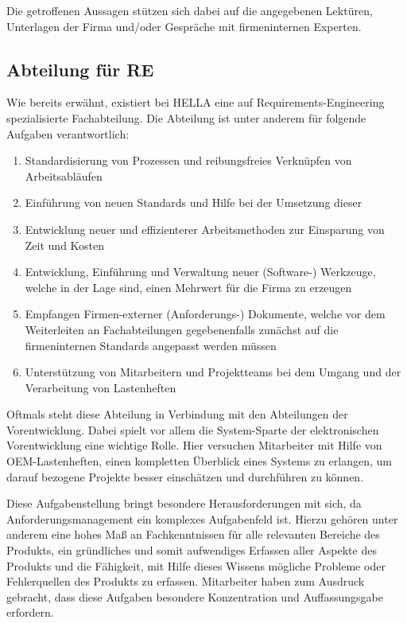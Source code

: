 \documentclass[12pt]{report}
\begin{document}
Die getroffenen Aussagen stützen sich dabei auf die angegebenen Lektüren, Unterlagen der Firma und/oder Gespräche mit firmeninternen Experten. 

\subsection{Abteilung für RE}
Wie bereits erwähnt, existiert bei HELLA eine auf Requirements-Engineering spezialisierte Fachabteilung. Die Abteilung ist unter anderem für folgende Aufgaben verantwortlich: 
\begin{enumerate}
\item Standardisierung von Prozessen und reibungsfreies Verknüpfen von Arbeitsabläufen
\item Einführung von neuen Standards und Hilfe bei der Umsetzung dieser
\item Entwicklung neuer und effizienterer Arbeitsmethoden zur Einsparung von Zeit und Kosten
\item Entwicklung, Einführung und Verwaltung neuer (Software-) Werkzeuge, welche in der Lage sind, einen Mehrwert für die Firma zu erzeugen
\item Empfangen Firmen-externer (Anforderungs-) Dokumente, welche vor dem Weiterleiten an Fachabteilungen gegebenenfalls zunächst auf die firmeninternen Standards angepasst werden müssen
\item Unterstützung von Mitarbeitern und Projektteams bei dem Umgang und der Verarbeitung von Lastenheften
\end{enumerate}

Oftmals steht diese Abteilung in Verbindung mit den Abteilungen der Vorentwicklung. Dabei spielt vor allem die System-Sparte der elektronischen Vorentwicklung eine wichtige Rolle. Hier versuchen Mitarbeiter mit Hilfe von OEM-Lastenheften, einen kompletten Überblick eines Systems zu erlangen, um darauf bezogene Projekte besser einschätzen und durchführen zu können. 

Diese Aufgabenstellung bringt besondere Herausforderungen mit sich, da Anforderungsmanagement ein komplexes Aufgabenfeld ist.  Hierzu gehören unter anderem eine hohes Maß an Fachkenntnissen für alle relevanten Bereiche des Produkts, ein gründliches und somit aufwendiges Erfassen aller Aspekte des Produkts und die Fähigkeit, mit Hilfe dieses Wissens mögliche Probleme oder Fehlerquellen des Produkts zu erfassen. Mitarbeiter haben zum Ausdruck gebracht, dass diese Aufgaben besondere Konzentration und Auffassungsgabe erfordern.
\end{document}
